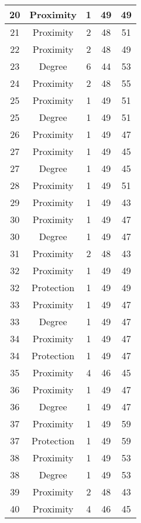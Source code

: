 \documentclass[results.tex]{subfiles}
\begin{document}
\begin{center}
\begin{tabular}{| c || c | c | c | c |}
    \hline
    20 & Proximity & 1 & 49 & 49 \\ 
    \hline
    21 & Proximity & 2 & 48 & 51 \\ 
    \hline
    22 & Proximity & 2 & 48 & 49 \\ 
    \hline
    23 & Degree & 6 & 44 & 53 \\ 
    \hline
    24 & Proximity & 2 & 48 & 55 \\ 
    \hline
    25 & Proximity & 1 & 49 & 51 \\ 
    \hline
    25 & Degree & 1 & 49 & 51 \\ 
    \hline
    26 & Proximity & 1 & 49 & 47 \\ 
    \hline
    27 & Proximity & 1 & 49 & 45 \\ 
    \hline
    27 & Degree & 1 & 49 & 45 \\ 
    \hline
    28 & Proximity & 1 & 49 & 51 \\ 
    \hline
    29 & Proximity & 1 & 49 & 43 \\ 
    \hline
    30 & Proximity & 1 & 49 & 47 \\ 
    \hline
    30 & Degree & 1 & 49 & 47 \\ 
    \hline
    31 & Proximity & 2 & 48 & 43 \\ 
    \hline
    32 & Proximity & 1 & 49 & 49 \\ 
    \hline
    32 & Protection & 1 & 49 & 49 \\ 
    \hline
    33 & Proximity & 1 & 49 & 47 \\ 
    \hline
    33 & Degree & 1 & 49 & 47 \\ 
    \hline
    34 & Proximity & 1 & 49 & 47 \\ 
    \hline
    34 & Protection & 1 & 49 & 47 \\ 
    \hline
    35 & Proximity & 4 & 46 & 45 \\ 
    \hline
    36 & Proximity & 1 & 49 & 47 \\ 
    \hline
    36 & Degree & 1 & 49 & 47 \\ 
    \hline
    37 & Proximity & 1 & 49 & 59 \\ 
    \hline
    37 & Protection & 1 & 49 & 59 \\ 
    \hline
    38 & Proximity & 1 & 49 & 53 \\ 
    \hline
    38 & Degree & 1 & 49 & 53 \\ 
    \hline
    39 & Proximity & 2 & 48 & 43 \\ 
    \hline
    40 & Proximity & 4 & 46 & 45 \\ 

\end{tabular}
\end{center}
\end{document}

